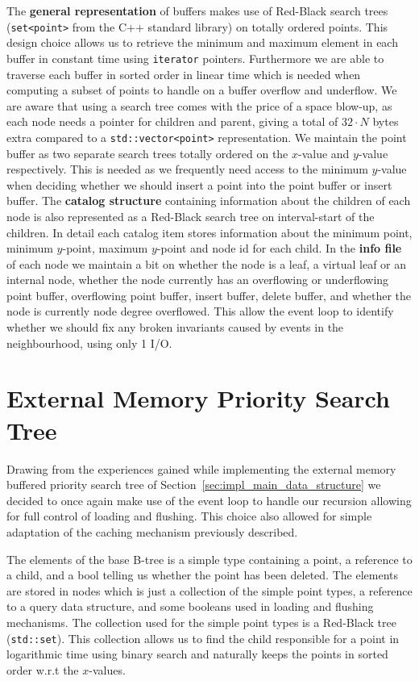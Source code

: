 \documentclass[twoside,11pt,openright]{report}
\begin{document}
The \textbf{general representation} of buffers makes use of Red-Black search trees (\texttt{set<point>} from the C++ standard library) on totally ordered points. This design choice allows us to retrieve the minimum and maximum element in each buffer in constant time using \texttt{iterator} pointers. Furthermore we are able to traverse each buffer in sorted order in linear time which is needed when computing a subset of points to handle on a buffer overflow and underflow. We are aware that using a search tree comes with the price of a space blow-up, as each node needs a pointer for children and parent, giving a total of $32 \cdot N$ bytes extra compared to a \texttt{std::vector<point>} representation. We maintain the point buffer as two separate search trees totally ordered on the $x$-value and $y$-value respectively. This is needed as we frequently need access to the minimum $y$-value when deciding whether we should insert a point into the point buffer or insert buffer. The \textbf{catalog structure} containing information about the children of each node is also represented as a Red-Black search tree on interval-start of the children. In detail each catalog item stores information about the minimum point, minimum $y$-point, maximum $y$-point and node id for each child. In the \textbf{info file} of each node we maintain a bit on whether the node is a leaf, a virtual leaf or an internal node, whether the node currently has an overflowing or underflowing point buffer, overflowing point buffer, insert buffer, delete buffer, and whether the node is currently node degree overflowed. This allow the event loop to identify whether we should fix any broken invariants caused by events in the neighbourhood, using only 1 I/O.

\section{External Memory Priority Search Tree}
Drawing from the experiences gained while implementing the external memory buffered priority search tree of Section~\ref{sec:impl_main_data_structure} we decided to once again make use of the event loop to handle our recursion allowing for full control of loading and flushing. This choice also allowed for simple adaptation of the caching mechanism previously described.

The elements of the base B-tree is a simple type containing a point, a reference to a child, and a bool telling us whether the point has been deleted. The elements are stored in nodes which is just a collection of the simple point types, a reference to a query data structure, and some booleans used in loading and flushing mechanisms. The collection used for the simple point types is a Red-Black tree (\texttt{std::set}). This collection allows us to find the child responsible for a point in logarithmic time using binary search and naturally keeps the points in sorted order w.r.t the $x$-values.
\end{document}
